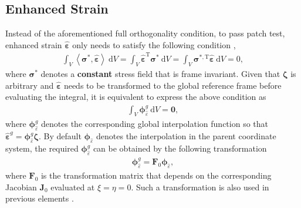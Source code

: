 \documentclass[3p,sort&compress,review,11pt]{elsarticle}
\newcommand*{\md}[1]{\mathrm{d}#1}
\newcommand*{\mT}{\mathrm{T}}
\begin{document}
\subsection{Enhanced Strain}
Instead of the aforementioned full orthogonality condition, to pass patch test, enhanced strain $\hat{\mathbold{\varepsilon}}$ only needs to satisfy the following condition \citep{Simo1990,Taylor1976},
\begin{gather*}
\int_V\left\langle\mathbold{\sigma}^*,\hat{\mathbold{\varepsilon}}\right\rangle~\md{V}=\int_V\hat{\mathbold{\varepsilon}}^\mT\mathbold{\sigma}^*~\md{V}=\int_V\mathbold{\sigma}^{*,\mT}\hat{\mathbold{\varepsilon}}~\md{V}=0,
\end{gather*}
where $\mathbold{\sigma}^*$ denotes a \textbf{constant} stress field that is frame invariant. Given that $\mathbold{\zeta}$ is arbitrary and $\hat{\mathbold{\varepsilon}}$ needs to be transformed to the global reference frame before evaluating the integral, it is equivalent to express the above condition as
\begin{gather}\label{eq:final_enhanced_strain}
\int_V\mathbold{\phi}_{\hat{\varepsilon}}^g~\md{V}=\mathbold{0},
\end{gather}
where $\mathbold{\phi}_{\hat{\varepsilon}}^g$ denotes the corresponding global interpolation function so that $\hat{\mathbold{\varepsilon}}^g=\mathbold{\phi}_{\hat{\varepsilon}}^g\mathbold{\zeta}$. By default $\mathbold{\phi}_{\hat{\varepsilon}}$ denotes the interpolation in the parent coordinate system, the required $\mathbold{\phi}_{\hat{\varepsilon}}^g$ can be obtained by the following transformation
\begin{gather}\label{eq:enhanced_strain_trans}
\mathbold{\phi}_{\hat{\varepsilon}}^g=\mathbold{F}_0\mathbold{\phi}_{\hat{\varepsilon}},
\end{gather}
where $\mathbold{F}_0$ is the transformation matrix that depends on the corresponding Jacobian $\mathbold{J}_0$ evaluated at $\xi=\eta=0$. Such a transformation is also used in previous elements \citep[e.g.,][]{Pian1984}.
\end{document}
